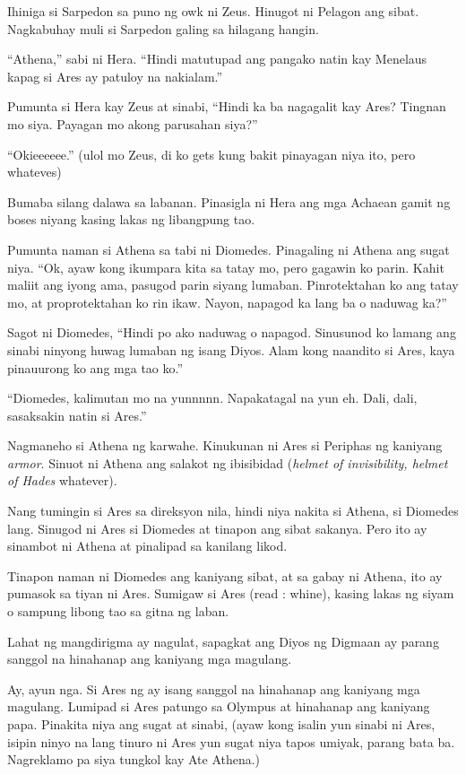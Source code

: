 \documentclass[12pt,letterpaper]{report}
\begin{document}
Ihiniga si Sarpedon sa puno ng owk ni Zeus. Hinugot ni Pelagon ang sibat. Nagkabuhay muli si Sarpedon galing sa hilagang hangin.

``Athena,'' sabi ni Hera. ``Hindi matutupad ang pangako natin kay Menelaus kapag si Ares ay patuloy na nakialam.''

Pumunta si Hera kay Zeus at sinabi, ``Hindi ka ba nagagalit kay Ares? Tingnan mo siya. Payagan mo akong parusahan siya?''

``Okieeeeee.'' (ulol mo Zeus, di ko gets kung bakit pinayagan niya ito, pero whateves)

Bumaba silang dalawa sa labanan. Pinasigla ni Hera ang mga Achaean gamit ng boses niyang kasing lakas ng libangpung tao.

Pumunta naman si Athena sa tabi ni Diomedes. Pinagaling ni Athena ang sugat niya. ``Ok, ayaw kong ikumpara kita sa tatay mo, pero gagawin ko parin. Kahit maliit ang iyong ama, pasugod parin siyang lumaban. Pinrotektahan ko ang tatay mo, at proprotektahan ko rin ikaw. Nayon, napagod ka lang ba o naduwag ka?''

Sagot ni Diomedes, ``Hindi po ako naduwag o napagod. Sinusunod ko lamang ang sinabi ninyong huwag lumaban ng isang Diyos. Alam kong naandito si Ares, kaya pinauurong ko ang mga tao ko.''

``Diomedes, kalimutan mo na yunnnnn. Napakatagal na yun eh. Dali, dali, sasaksakin natin si Ares.''

Nagmaneho si Athena ng karwahe. Kinukunan ni Ares si Periphas ng kaniyang \textit{armor}. Sinuot ni Athena ang salakot ng ibisibidad (\textit{helmet of invisibility, helmet of Hades} whatever).

Nang tumingin si Ares sa direksyon nila, hindi niya nakita si Athena, si Diomedes lang. Sinugod ni Ares si Diomedes at tinapon ang sibat sakanya. Pero ito ay sinambot ni Athena at pinalipad sa kanilang likod.

Tinapon naman ni Diomedes ang kaniyang sibat, at sa gabay ni Athena, ito ay pumasok sa tiyan ni Ares. Sumigaw si Ares (read : whine), kasing lakas ng siyam o sampung libong tao sa gitna ng laban.

Lahat ng mangdirigma ay nagulat, sapagkat ang Diyos ng Digmaan ay parang sanggol na hinahanap ang kaniyang mga magulang.

Ay, ayun nga. Si Ares ng ay isang sanggol na hinahanap ang kaniyang mga magulang. Lumipad si Ares patungo sa Olympus at hinahanap ang kaniyang papa. Pinakita niya ang sugat at sinabi, (ayaw kong isalin yun sinabi ni Ares, isipin ninyo na lang tinuro ni Ares yun sugat niya tapos umiyak, parang bata ba. Nagreklamo pa siya tungkol kay Ate Athena.)
\end{document}
